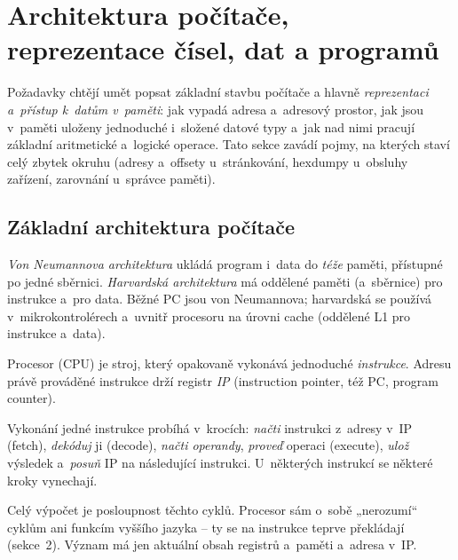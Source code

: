 \section{Architektura počítače, reprezentace čísel, dat a programů}

Požadavky chtějí umět popsat základní stavbu počítače a hlavně \emph{reprezentaci a~přístup k~datům v~paměti}: jak vypadá adresa a~adresový prostor, jak jsou v~paměti uloženy jednoduché i~složené datové typy a~jak nad nimi pracují základní aritmetické a~logické operace. Tato sekce zavádí pojmy, na kterých staví celý zbytek okruhu (adresy a~offsety u~stránkování, hexdumpy u~obsluhy zařízení, zarovnání u~správce paměti).

\subsection{Základní architektura počítače}

\begin{definice}
\emph{Von Neumannova architektura} ukládá program i~data do \emph{téže} paměti, přístupné po jedné sběrnici. \emph{Harvardská architektura} má oddělené paměti (a~sběrnice) pro instrukce a~pro data. Běžné PC jsou von Neumannova; harvardská se používá v~mikrokontrolérech a~uvnitř procesoru na úrovni cache (oddělené L1 pro instrukce a~data).
\end{definice}

Procesor (CPU) je stroj, který opakovaně vykonává jednoduché \emph{instrukce}. Adresu právě prováděné instrukce drží registr \emph{IP} (instruction pointer, též PC, program counter).

\begin{definice}
Vykonání jedné instrukce probíhá v~krocích: \emph{načti} instrukci z~adresy v~IP (fetch), \emph{dekóduj} ji (decode), \emph{načti operandy}, \emph{proveď} operaci (execute), \emph{ulož} výsledek a~\emph{posuň} IP na následující instrukci. U~některých instrukcí se některé kroky vynechají.
\end{definice}

\begin{intuice}
Celý výpočet je posloupnost těchto cyklů. Procesor sám o~sobě „nerozumí`` cyklům ani funkcím vyššího jazyka -- ty se na instrukce teprve překládají (sekce~2). Význam má jen aktuální obsah registrů a~paměti a~adresa v~IP.
\end{intuice}

